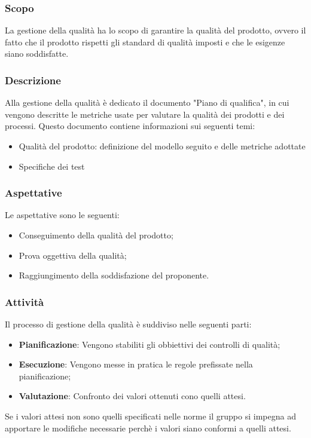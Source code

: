 \documentclass[../norme_di_progetto.tex]{subfiles}
\begin{document}
\subsubsection{Scopo}
La gestione della qualità ha lo scopo di garantire la qualità del prodotto, ovvero il fatto che il prodotto rispetti gli standard di qualità imposti e che le esigenze siano soddisfatte.

\subsubsection{Descrizione}
Alla gestione della qualità è dedicato il documento "Piano di qualifica", in cui vengono descritte le metriche usate per valutare la qualità dei prodotti e dei processi. Questo documento contiene informazioni sui seguenti temi:
\begin{itemize}
    \item Qualità del prodotto: definizione del modello seguito e delle metriche adottate
    \item Specifiche dei test
\end{itemize}

\subsubsection{Aspettative}
Le aspettative sono le seguenti:
\begin{itemize}
    \item Conseguimento della qualità del prodotto;
    \item Prova oggettiva della qualità;
    \item Raggiungimento della soddisfazione del proponente.
\end{itemize}

\subsubsection{Attività}
Il processo di gestione della qualità è suddiviso nelle seguenti parti:
\begin{itemize}
    \item \textbf{Pianificazione}: Vengono stabiliti gli obbiettivi dei controlli di qualità;
    \item \textbf{Esecuzione}: Vengono messe in pratica le regole prefissate nella pianificazione;
    \item \textbf{Valutazione}: Confronto dei valori ottenuti cono quelli attesi.
\end{itemize}
Se i valori attesi non sono quelli specificati nelle norme il gruppo si impegna ad apportare le modifiche necessarie perchè i valori siano conformi a quelli attesi.
\end{document}
